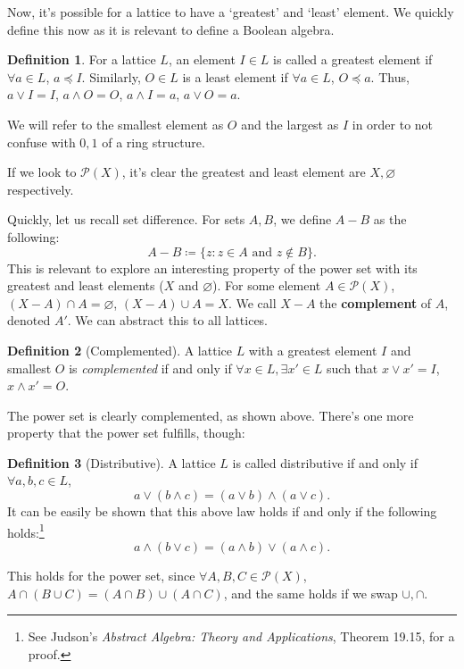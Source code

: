 \documentclass[10pt, letterpaper]{article}
\newcommand{\set}[1]{\{#1\}}
\newcommand{\powerset}[1]{\mathcal{P}(#1)}
\theoremstyle{definition}
\newtheorem{definition}{Definition}[section]
\begin{document}
Now, it's possible for a lattice to have a `greatest' and `least' element.
We quickly define this now as it is relevant to define a Boolean algebra.

\begin{definition}
	For a lattice \(L\), an element \(I\in L\) is called a greatest element if
	\(\forall a\in L\), \(a\preceq I\). Similarly, \(O\in L\) is a least element
	if \(\forall a\in L\), \(O\preceq a\). Thus, \(a\vee I=I\), \(a\wedge O=O\),
	\(a\wedge I = a\), \(a\vee O = a\).

	We will refer to the smallest element as \(O\) and the largest as \(I\)
	in order to not confuse with $0,1$ of a ring structure.
\end{definition}

If we look to \(\powerset{X}\), it's clear the greatest and least element 
are \(X,\varnothing\) respectively.

Quickly, let us recall set difference. 
For sets \(A,B\), we define \(A-B\) as the following:
\[A-B\coloneqq \set{z:z\in A\text{ and }z\notin B}.\]
This is relevant to explore an interesting property of the power set with 
its greatest and least elements (\(X\) and \(\varnothing\)).
For some element \(A\in\powerset{X}\),
\((X-A)\cap A = \varnothing\), \((X-A)\cup A=X\).
We call \(X-A\) the \textbf{complement} of \(A\), denoted \(A'\).
We can abstract this to all lattices.

\begin{definition}[Complemented]
	A lattice \(L\)  with a greatest element \(I\) and smallest \(O\)
	is \textit{complemented} if and only if 
	\(\forall x\in L, \exists x'\in L\) such that
	\(x\vee x'=I\), \(x\wedge x'=O\). 
\end{definition}

The power set is clearly complemented, as shown above.
There's one more property that the power set fulfills, though:

\begin{definition}[Distributive]
	A lattice \(L\) is called distributive if and only if \(\forall a,b,c\in L\),
	\[a\vee(b\wedge c)=(a\vee b)\wedge (a\vee c).\]
	It can be easily be shown that this above law holds 
	if and only if the following
	holds:\footnote{
		See Judson's \textit{Abstract Algebra: Theory and Applications}, 
	Theorem 19.15, for a proof.}
	\[a\wedge(b\vee c)=(a\wedge b)\vee (a\wedge c).\]
\end{definition}

This holds for the power set, since \(\forall A,B,C\in\powerset{X}\), 
\(A\cap (B\cup C)=(A\cap B)\cup(A\cap C)\), and the same holds if we swap \(\cup, \cap\).
\end{document}
